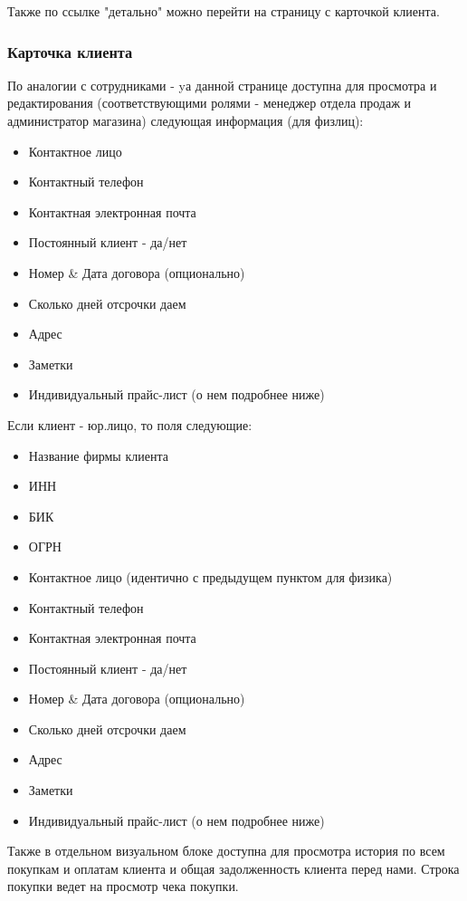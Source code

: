 \documentclass[DIV=calc, paper=a4, fontsize=11pt]{scrartcl} %
\begin{document}
Также по ссылке "детально" можно перейти на страницу с карточкой клиента.

\subsubsection{Карточка клиента}

По аналогии с сотрудниками - yа данной странице доступна для просмотра и редактирования (соответствующими ролями - менеджер отдела продаж и администратор магазина) следующая информация (для физлиц): 

\begin{itemize}
	\item Контактное лицо
	\item Контактный телефон
	\item Контактная электронная почта
	\item Постоянный клиент - да/нет
	\item Номер \& Дата договора (опционально)
	\item Сколько дней отсрочки даем
	\item Адрес 
	\item Заметки
	\item Индивидуальный прайс-лист (о нем подробнее ниже)
\end{itemize}

Если клиент - юр.лицо, то поля следующие:

\begin{itemize}
	\item Название фирмы клиента
	\item ИНН
	\item БИК
	\item ОГРН
	\item Контактное лицо (идентично с предыдущем пунктом для физика)
	\item Контактный телефон
	\item Контактная электронная почта
	\item Постоянный клиент - да/нет
	\item Номер \& Дата договора (опционально)
	\item Сколько дней отсрочки даем
	\item Адрес 
	\item Заметки
	\item Индивидуальный прайс-лист (о нем подробнее ниже)
\end{itemize}


Также в отдельном визуальном блоке доступна для просмотра история по всем покупкам и оплатам клиента и общая задолженность клиента перед нами. Строка покупки ведет на просмотр чека покупки.  
\end{document}
